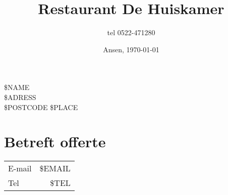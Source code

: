 \documentclass{scrartcl}
\begin{document}
\title{Restaurant De Huiskamer}
\subtitle{tel 0522-471280}
\date{Ansen, \today}
\maketitle
\begin{flushright}
	\$NAME \\
	\$ADRESS \\
	\$POSTCODE \$PLACE
\end{flushright}
\section*{Betreft offerte}
\begin{tabular}{ l r }
  E-mail & \$EMAIL  \\
  Tel & \$TEL  \\
\end{tabular}
\end{document}
